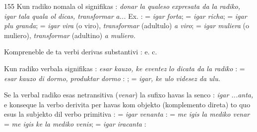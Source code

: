 \begin{VUpage}[159]{155}
Kun radiko nomala ol signifikas : \textit{donar la qualeso}\nl
\textit{expresata da la radiko, igar tala quala ol dicas, transformar}\nl
\textit{a...} Ex. :  = \textit{igar forta};  = \textit{igar richa}; \cc
{} = \textit{igar plu granda};  = \textit{igar vira} (o viro),\nl
\textit{transformar} (adultulo) \textit{a viro};  = \textit{igar muliera}\nl
(o muliero), \textit{transformar} (adultino) \textit{a muliero.}

Kompreneble de ta verbi derivas substantivi : \nl
{} e. c.

Kun radiko verbala  signifikas : \textit{esar kauzo, ke eventez}\nl
\textit{lo dicata da la radiko} :  = \textit{esar kauzo di dormo,}\nl
\textit{produktar dormo} : ;  =\nl
\textit{igar, ke ulo videsez da ulu.}

Se la verbal radiko esas netransitiva (\textit{venar}) la sufixo \nl
havas la senco : \textit{igar ...anta,} e konseque la verbo derivita\nl
per  havas kom objekto (komplemento direta) to quo\nl
esus la subjekto dil verbo primitiva :  = \textit{igar}\nl
\textit{venanta} :  = \textit{me igis la mediko venar}\nl
= \textit{me igis ke la mediko venis};  = \textit{igar iracanta} : \nl
{}
\end{VUpage}

